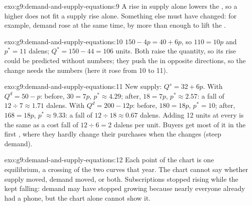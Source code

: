 \begin{solution}{exo:g9:demand-and-supply-equations:9}
A rise in supply alone lowers the , so a higher  does not fit a supply rise alone. Something
else must have changed: for example, demand rose at the same time, by more than enough to lift the
.
\end{solution}

\begin{solution}{exo:g9:demand-and-supply-equations:10}
$150 - 4p = 40 + 6p$, so $110 = 10p$ and $p^* = 11$ dalens; $Q^* = 150 - 44 = 106$ units. Both 
raise the quantity, so its rise could be predicted without numbers; they push the  in opposite
directions, so the  change needs the numbers (here it rose from 10 to 11).
\end{solution}

\begin{solution}{exo:g9:demand-and-supply-equations:11}
New supply: $Q^s = 32 + 6p$. With $Q^d = 50 - p$: before, $30 = 7p$, $p^* \approx 4.29$; after, $18 = 7p$,
$p^* \approx 2.57$: a fall of $12 \div 7 \approx 1.71$ dalens. With $Q^d = 200 - 12p$: before, $180 =
18p$, $p^* = 10$; after, $168 = 18p$, $p^* \approx 9.33$: a fall of $12 \div 18 \approx 0.67$ dalens.
Adding 12 units at every  is the same as a cost fall of $12 \div 6 = 2$ dalens per unit. Buyers
get most of it in the first , where they hardly change their purchases when the  changes
(steep demand).
\end{solution}

\begin{solution}{exo:g9:demand-and-supply-equations:12}
Each point of the chart is one equilibrium, a crossing of the two curves that year. The chart cannot
say whether supply moved, demand moved, or both. Subscriptions stopped rising while the  kept
falling: demand may have stopped growing because nearly everyone already had a phone, but the chart
alone cannot show it.
\end{solution}

